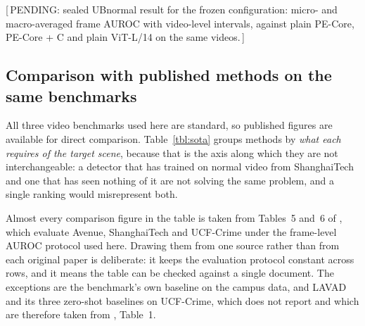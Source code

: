 \documentclass[a4paper,fleqn]{cas-sc}
\newcommand{\pending}[1]{{\sffamily\color{pendingcol}[\,PENDING: #1\,]}}
\begin{document}
\pending{sealed UBnormal result for the frozen configuration: micro- and
macro-averaged frame AUROC with video-level intervals, against plain PE-Core,
PE-Core + C and plain ViT-L/14 on the same videos.}

\subsection{Comparison with published methods on the same benchmarks}
\label{sec:res-comparison}
All three video benchmarks used here are standard, so published figures are
available for direct comparison. Table~\ref{tbl:sota} groups methods by \emph{what each
requires of the target scene}, because that is the axis along which they are not
interchangeable: a detector that has trained on normal video from ShanghaiTech
and one that has seen nothing of it are not solving the same problem, and a
single ranking would misrepresent both.

Almost every comparison figure in the table is taken from Tables~5 and~6 of
\citet{anyanomaly2025}, which evaluate Avenue, ShanghaiTech and UCF-Crime under
the frame-level AUROC protocol used here. Drawing them from one source rather
than from each original paper is deliberate: it keeps the evaluation protocol
constant across rows, and it means the table can be checked against a single
document. The exceptions are the benchmark's own baseline on the campus data,
and LAVAD and its three zero-shot baselines on UCF-Crime, which
\citet{anyanomaly2025} does not report and which are therefore taken from
\citet{zanella2024lavad}, Table~1.
\end{document}

